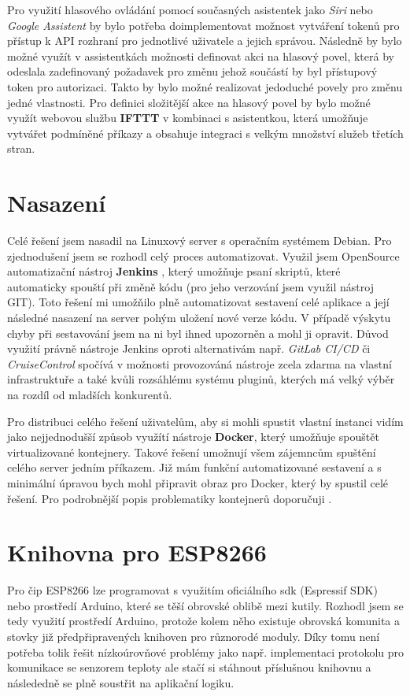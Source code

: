 Pro využití hlasového ovládání pomocí současných asistentek jako \textit{Siri} nebo \textit{Google Assistent} by bylo potřeba doimplementovat možnost vytváření tokenů pro přístup k API rozhraní pro jednotlivé uživatele a jejich správou. Následně by bylo možné využít v assistentkách možnosti definovat akci na hlasový povel, která by odeslala zadefinovaný požadavek pro změnu jehož součástí by byl přístupový token pro autorizaci. Takto by bylo možné realizovat jedoduché povely pro změnu jedné vlastnosti. Pro definici složitější akce na hlasový povel by bylo možné využít webovou službu \textbf{IFTTT} \cite{ifttt} v kombinaci s asistentkou, která umožňuje vytvářet podmíněné příkazy a obsahuje integraci s velkým množství služeb třetích stran.


\section{Nasazení}
Celé řešení jsem nasadil na Linuxový server s operačním systémem Debian. Pro zjednodušení jsem se rozhodl celý proces automatizovat. Využil jsem OpenSource automatizační nástroj \textbf{Jenkins} \cite{jenkins}, který umožňuje psaní skriptů, které automaticky spouští při změně kódu (pro jeho verzování jsem využil nástroj GIT). Toto řešení mi umožňilo plně automatizovat sestavení celé aplikace a její následné nasazení na server pohým uložení nové verze kódu. V případě výskytu chyby při sestavování jsem na ni byl ihned upozorněn a mohl ji opravit. Důvod využití právně nástroje Jenkins oproti alternativám např. \textit{GitLab CI/CD} či \textit{CruiseControl} spočívá v možnosti provozováná nástroje zcela zdarma na vlastní infrastruktuře a také kvůli rozsáhlému systému pluginů, kterých má velký výběr na rozdíl od mladších konkurentů.

Pro distribuci celého řešení uživatelům, aby si mohli spustit vlastní instanci vidím jako nejjednodušší způsob využítí nástroje \textbf{Docker}, který umožňuje spouštět virtualizované kontejnery. Takové řešení umožnují všem zájemncům spuštění celého server jedním příkazem. Již mám funkční automatizované sestavení a s minimální úpravou bych mohl připravit obraz pro Docker, který by spustil celé řešení. Pro podrobnější popis problematiky kontejnerů doporučuji \cite{containers}.


\section{Knihovna pro ESP8266}
\label{library}
Pro čip ESP8266 lze programovat s využitím oficiálního sdk (Espressif SDK) nebo prostředí Arduino, které se těší obrovské oblibě mezi kutily. Rozhodl jsem se tedy využití prostředí Arduino, protože kolem něho existuje obrovská komunita a stovky již předpřipravených knihoven pro různorodé moduly. Díky tomu není potřeba tolik řešit nízkoúrovňové problémy jako např. implementaci protokolu pro komunikace se senzorem teploty ale stačí si stáhnout příslušnou knihovnu a následedně se plně soustřit na aplikační logiku.

